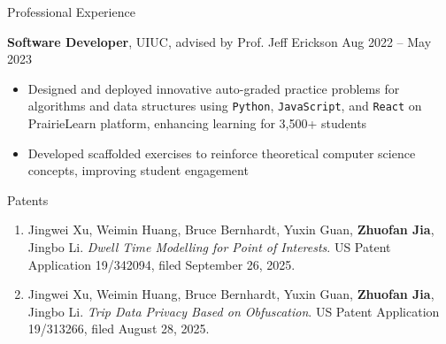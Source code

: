 \documentclass[hidelinks]{resume} %
\begin{document}
\begin{rSection}{P\MakeLowercase{rofessional} E\MakeLowercase{xperience}}
\vspace{-2pt}
 
\textbf{Software Developer}, UIUC, advised by Prof. Jeff Erickson
\hfill Aug 2022 -- May 2023
\vspace{-5pt}
\begin{itemize}
\itemsep -7pt {} 
\item Designed and deployed innovative auto-graded practice problems for algorithms and data structures using \texttt{Python}, \texttt{JavaScript}, and \texttt{React} on PrairieLearn platform, enhancing learning for 3,500+ students
\item Developed scaffolded exercises to reinforce theoretical computer science concepts, improving student engagement
\end{itemize}
 
\end{rSection} 



\vspace{-5pt}
\begin{rSection}{P\MakeLowercase{atents}}
\begin{enumerate}
\itemsep -4pt {}
\item Jingwei Xu, Weimin Huang, Bruce Bernhardt, Yuxin Guan, \textbf{Zhuofan Jia}, Jingbo Li. \textit{Dwell Time Modelling for Point of Interests}. US Patent Application 19/342094, filed September 26, 2025.
\item Jingwei Xu, Weimin Huang, Bruce Bernhardt, Yuxin Guan, \textbf{Zhuofan Jia}, Jingbo Li. \textit{Trip Data Privacy Based on Obfuscation}. US Patent Application 19/313266, filed August 28, 2025.
\end{enumerate}
\end{rSection}
 
\end{document}
